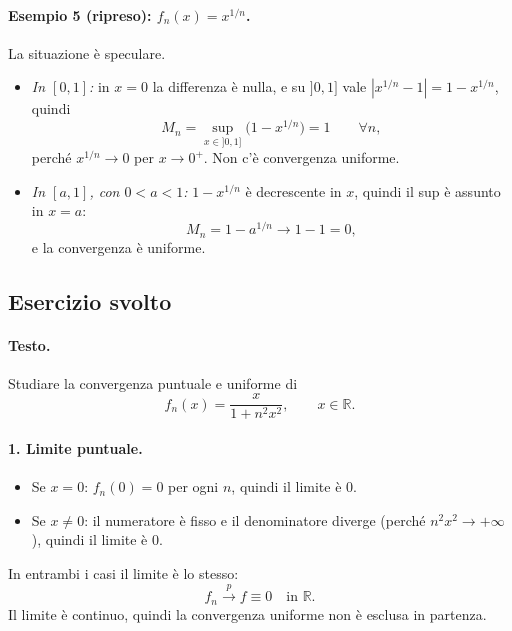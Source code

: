 \paragraph{Esempio 5 (ripreso): $f_n(x) = x^{1/n}$.} La situazione è
speculare.
\begin{itemize}
  \item \emph{In $[0,1]$:} in $x = 0$ la differenza è nulla, e su $]0,1]$ vale
  $|x^{1/n} - 1| = 1 - x^{1/n}$, quindi
  \[
    M_n = \sup_{x \in ]0,1]} \big(1 - x^{1/n}\big) = 1 \qquad \forall n ,
  \]
  perché $x^{1/n} \to 0$ per $x \to 0^+$. Non c'è convergenza uniforme.
  \item \emph{In $[a,1]$, con $0 < a < 1$:} $1 - x^{1/n}$ è decrescente in $x$,
  quindi il sup è assunto in $x = a$:
  \[
    M_n = 1 - a^{1/n} \longrightarrow 1 - 1 = 0 ,
  \]
  e la convergenza è uniforme.
\end{itemize}


\subsection{Esercizio svolto}

\paragraph{Testo.} Studiare la convergenza puntuale e uniforme di
\[
  f_n(x) = \frac{x}{1 + n^2 x^2}, \qquad x \in \mathbb{R} .
\]

\paragraph{1. Limite puntuale.}
\begin{itemize}
  \item Se $x = 0$: $f_n(0) = 0$ per ogni $n$, quindi il limite è $0$.
  \item Se $x \neq 0$: il numeratore è fisso e il denominatore diverge
  (perché $n^2 x^2 \to +\infty$), quindi il limite è $0$.
\end{itemize}
In entrambi i casi il limite è lo stesso:
\[
  f_n \xrightarrow{\;p\;} f \equiv 0 \quad \text{in } \mathbb{R} .
\]
Il limite è continuo, quindi la convergenza uniforme non è esclusa in partenza.

